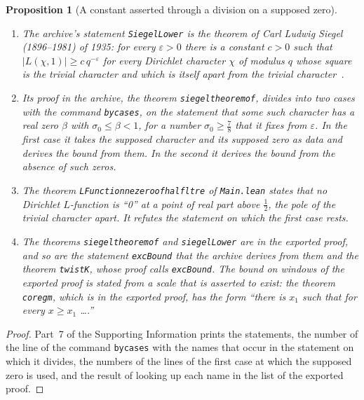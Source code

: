 \documentclass[11pt]{article}
\newtheorem{proposition}[theorem]{Proposition}
\theoremstyle{definition}
\theoremstyle{remark}
\DeclareRobustCommand{\lean}[1]{{\renewcommand{\_}{\textunderscore\allowbreak}\texttt{#1}}}
\begin{document}
\begin{proposition}[A constant asserted through a division on a supposed zero]\label{prop:siegel}
\leavevmode
\begin{enumerate}[leftmargin=2em,itemsep=1pt]\sloppy
\item The archive's statement \lean{SiegelLower} is the theorem of Carl Ludwig Siegel (1896--1981) of 1935: for every $\varepsilon>0$ there is a constant $c>0$ such that $|L(\chi,1)|\ge c\,q^{-\varepsilon}$ for every Dirichlet character $\chi$ of modulus $q$ whose square is the trivial character and which is itself apart from the trivial character~\citep{siegel35}.
\item Its proof in the archive, the theorem \lean{siegel\_theorem\_of}, divides into two cases with the command \lean{by\_cases}, on the statement that some such character has a real zero $\beta$ with $\sigma_0\le\beta<1$, for a number $\sigma_0\ge\tfrac78$ that it fixes from $\varepsilon$. In the first case it takes the supposed character and its supposed zero as data and derives the bound from them. In the second it derives the bound from the absence of such zeros.
\item The theorem \lean{LFunction\_ne\_zero\_of\_half\_lt\_re} of \lean{Main.lean} states that no Dirichlet $L$-function is ``0'' at a point of real part above $\tfrac12$, the pole of the trivial character apart. It refutes the statement on which the first case rests.
\item The theorems \lean{siegel\_theorem\_of} and \lean{siegelLower} are in the exported proof, and so are the statement \lean{excBound} that the archive derives from them and the theorem \lean{twistK}, whose proof calls \lean{excBound}. The bound on windows of the exported proof is stated from a scale that is asserted to exist: the theorem \lean{core\_gm}, which is in the exported proof, has the form ``there is $x_1$ such that for every $x\ge x_1$ \dots.''
\end{enumerate}
\end{proposition}

\begin{proof}
Part~7 of the Supporting Information prints the statements, the number of the line of the command \lean{by\_cases} with the names that occur in the statement on which it divides, the numbers of the lines of the first case at which the supposed zero is used, and the result of looking up each name in the list of the exported proof.
\end{proof}
\end{document}
